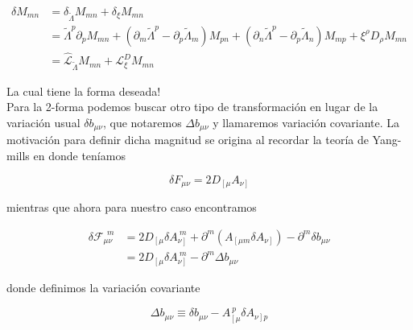 \documentclass{article}
\numberwithin{equation}{section}
\begin{document}
\begin{boxquation}
\begin{equation}
\begin{aligned}
\delta M_{m n} &= \delta_{\widetilde{\Lambda}} M_{m n} + \delta_{\xi} M_{m n}\\
&= \widetilde{\Lambda}^p \partial_p M_{m n} + \left(\partial_m \widetilde{\Lambda}^p - \partial_p \widetilde{\Lambda}_m\right) M_{p n} + \left(\partial_n \widetilde{\Lambda}^p - \partial_p \widetilde{\Lambda}_n\right) M_{m p} + \xi^{\rho} D_{\rho} M_{m n}\\
&= \hat{\mathcal{L}}_{\widetilde{\Lambda}} M_{m n} + \mathcal{L}_{\xi}^D M_{m n}
\end{aligned}
\end{equation}
\end{boxquation}

La cual tiene la forma deseada!\\

Para la 2-forma podemos buscar otro tipo de transformación en lugar de la variación usual $ \delta b_{\mu \nu} $, que notaremos $ \Delta b_{\mu \nu} $ y llamaremos variación covariante. La motivación para definir dicha magnitud se origina al recordar la teoría de Yang-mills en donde teníamos

\begin{equation}
\delta F_{\mu \nu} = 2 D_{\left[\mu \right.} A_{\left.\nu \right]} 
\end{equation}

mientras que ahora para nuestro caso encontramos

\begin{equation}\begin{aligned}
\delta \mathcal{F}_{\mu \nu}^{\ \ m} &= 2 D_{\left[\mu \right.} \delta A_{\left.\nu \right]}^{\ m } + \partial^m \left( A_{\left[\mu m \right.} \delta A_{\left.\nu \right]}\right) - \partial^m \delta b_{\mu \nu}\\
&= 2 D_{\left[\mu \right.} \delta A_{\left.\nu \right]}^{\ m } - \partial^m \Delta b_{\mu \nu}
\end{aligned}
\end{equation}

donde definimos la variación covariante

\begin{equation}\label{variacioncovariante}
\Delta b_{\mu \nu} \equiv \delta b_{\mu \nu} - A_{\left[\mu \right.}^{\ p} \delta A_{\left.\nu \right] p}
\end{equation}
\end{document}
